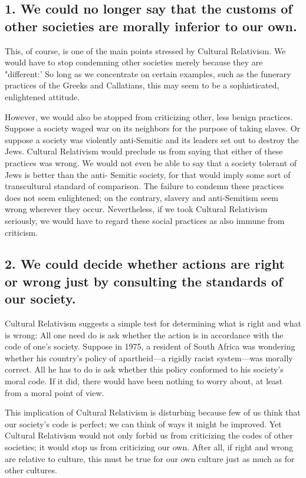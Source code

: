\subsection{1. We could no longer say that the customs of other societies are morally 
inferior to our own.} 
This, of course, is one of the main points stressed by 
Cultural  Relativism. We  would  have to  stop condemning  other  societies 
merely  because  they  are  "different:'  So  long  as  we  concentrate  on 
certain  examples,  such  as  the  funerary  practices  of  the  Greeks  and 
Callatians, this may seem to be a sophisticated, enlightened attitude. 

However,  we  would  also  be  stopped  from  criticizing  other,  less  benign 
practices. Suppose a society waged war on its neighbors for the purpose 
of taking slaves. Or suppose a society was violently anti-Semitic and its 
leaders  set  out  to  destroy the  Jews.  Cultural  Relativism  would  preclude 
us  from  saying that  either  of  these  practices  was  wrong. We  would  not 
even be able to say that a society tolerant of Jews is better than the anti-
Semitic society, for  that would imply some  sort of transcultural standard 
of  comparison.  The  failure  to  condemn  these  practices  does  not  seem 
enlightened;  on  the  contrary,  slavery  and  anti-Semitism  seem  wrong 
wherever they occur. Nevertheless, if we took Cultural Relativism 
seriously,  we  would  have  to  regard  these social  practices  as  also 
immune from criticism. 

\subsection{2. We could decide whether actions are right or wrong just by consulting 
the  standards of  our  society.}
Cultural  Relativism  suggests  a  simple test 
for  determining  what  is  right  and  what  is  wrong:  All  one  need  do  is  ask 
whether  the  action  is  in  accordance  with  the  code  of  one's  society. 
Suppose in 1975, a resident of South Africa was wondering whether his 
country's policy of apartheid—a rigidly racist system—was morally 
correct.  All  he  has  to  do  is  ask  whether  this  policy  conformed  to  his 
society's  moral  code.  If  it  did,  there  would  have  been  nothing  to  worry 
about, at least from a moral point of view. 

This  implication  of  Cultural  Relativism  is  disturbing  because  few  of  us 
think that our society's code is perfect; we can think of ways it might be 
improved. Yet Cultural Relativism would not only forbid us from criticizing 
the  codes  of  other  societies;  it  would  stop  us  from  criticizing  our  own. 
After  all,  if  right  and  wrong  are  relative  to  culture,  this  must  be  true  for 
our own culture just as much as for other cultures. 

